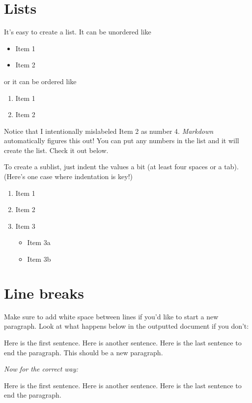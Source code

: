 \documentclass[12pt,twoside]{reedthesis}
\providecommand{\tightlist}{%
  \setlength{\itemsep}{0pt}\setlength{\parskip}{0pt}}
\begin{document}
\hypertarget{lists}{%
\section{Lists}\label{lists}}

It's easy to create a list. It can be unordered like
\begin{itemize}
\tightlist
\item
  Item 1
\item
  Item 2
\end{itemize}
or it can be ordered like
\begin{enumerate}
\def\labelenumi{\arabic{enumi}.}
\tightlist
\item
  Item 1
\item
  Item 2
\end{enumerate}
Notice that I intentionally mislabeled Item 2 as number 4. \emph{Markdown} automatically figures this out! You can put any numbers in the list and it will create the list. Check it out below.

To create a sublist, just indent the values a bit (at least four spaces or a tab). (Here's one case where indentation is key!)
\begin{enumerate}
\def\labelenumi{\arabic{enumi}.}
\tightlist
\item
  Item 1
\item
  Item 2
\item
  Item 3
  \begin{itemize}
  \tightlist
  \item
    Item 3a
  \item
    Item 3b
  \end{itemize}
\end{enumerate}
\hypertarget{line-breaks}{%
\section{Line breaks}\label{line-breaks}}

Make sure to add white space between lines if you'd like to start a new paragraph. Look at what happens below in the outputted document if you don't:

Here is the first sentence. Here is another sentence. Here is the last sentence to end the paragraph.
This should be a new paragraph.

\emph{Now for the correct way:}

Here is the first sentence. Here is another sentence. Here is the last sentence to end the paragraph.
\end{document}
